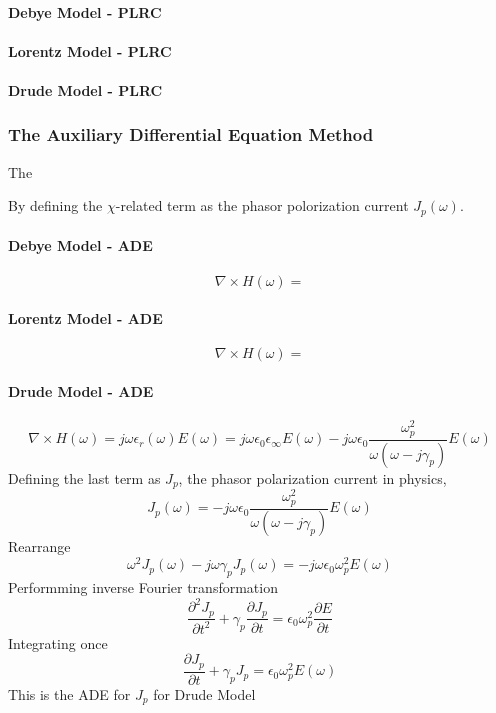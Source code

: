 \paragraph{{\msjh Debye Model - PLRC}}

\paragraph{{\msjh Lorentz Model - PLRC}}

\paragraph{{\msjh Drude Model - PLRC}}

\subsubsection{The Auxiliary Differential Equation Method}
The 

By defining the $\chi$-related term as the phasor polorization current $J_p(\omega)$.
\paragraph{{\msjh Debye Model - ADE}}
\begin{equation}
  \nabla \times H(\omega) = 
\end{equation}
\paragraph{{\msjh Lorentz Model - ADE}}
\begin{equation}
  \nabla \times H(\omega) = 
\end{equation}
\paragraph{{\msjh Drude Model - ADE}}
\begin{equation}
  \nabla \times H(\omega) = j\omega \epsilon_r(\omega)E(\omega) = j\omega\epsilon_0 \epsilon_{\infty} E(\omega) - j\omega\epsilon_0\frac{\omega_p^2}{\omega(\omega-j\gamma_p)}E(\omega)
\end{equation}
Defining the last term as $J_p$, the phasor polarization current in physics,
\begin{equation}
  J_p(\omega) = -j\omega\epsilon_0\frac{\omega_p^2}{\omega(\omega-j\gamma_p)}E(\omega)
\end{equation}
Rearrange
\begin{equation}
  \omega^2J_p(\omega) - j\omega\gamma_pJ_p(\omega) = -j\omega\epsilon_0\omega_p^2 E(\omega)
\end{equation}
Performming inverse Fourier transformation
\begin{equation}
  \frac{\partial^2 J_p}{\partial t^2} + \gamma_p \frac{\partial J_p}{\partial t} = \epsilon_0\omega_p^2\frac{\partial E}{\partial t}
\end{equation}
Integrating once
\begin{equation}
  \frac{\partial J_p}{\partial t} + \gamma_p J_p = \epsilon_0 \omega_p^2 E(\omega)
\end{equation}
This is the ADE for $J_p$ for Drude Model

